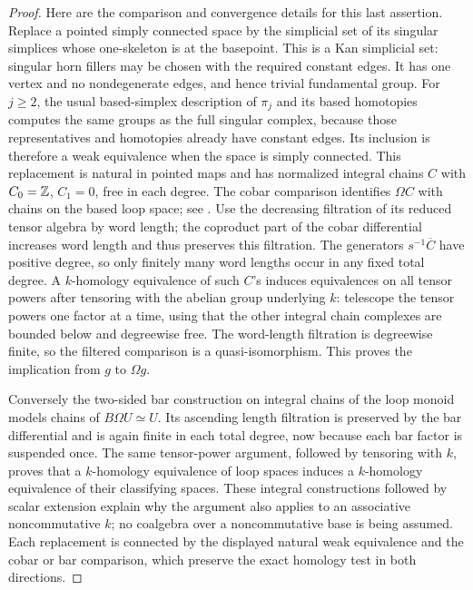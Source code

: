 \begin{proof}
Here are the comparison and convergence details for this last assertion.  Replace a pointed simply connected space by the simplicial set of its singular simplices whose one-skeleton is at the basepoint.  This is a Kan simplicial set: singular horn fillers may be chosen with the required constant edges.  It has one vertex and no nondegenerate edges, and hence trivial fundamental group.  For $j\geq2$, the usual based-simplex description of $\pi_j$ and its based homotopies computes the same groups as the full singular complex, because those representatives and homotopies already have constant edges.  Its inclusion is therefore a weak equivalence when the space is simply connected.  This replacement is natural in pointed maps and has normalized integral chains $C$ with $C_0=\mathbb Z$, $C_1=0$, free in each degree.  The cobar comparison identifies $\Omega C$ with chains on the based loop space; see \citet[Corollary 9.2 and Remark 9.3]{C_RiveraZeinalian2018}.  Use the decreasing filtration of its reduced tensor algebra by word length; the coproduct part of the cobar differential increases word length and thus preserves this filtration.  The generators $s^{-1}\overline C$ have positive degree, so only finitely many word lengths occur in any fixed total degree.  A $k$-homology equivalence of such $C$'s induces equivalences on all tensor powers after tensoring with the abelian group underlying $k$: telescope the tensor powers one factor at a time, using that the other integral chain complexes are bounded below and degreewise free.  The word-length filtration is degreewise finite, so the filtered comparison is a quasi-isomorphism.  This proves the implication from $g$ to $\Omega g$.

Conversely the two-sided bar construction on integral chains of the loop monoid models chains of $B\Omega U\simeq U$.  Its ascending length filtration is preserved by the bar differential and is again finite in each total degree, now because each bar factor is suspended once.  The same tensor-power argument, followed by tensoring with $k$, proves that a $k$-homology equivalence of loop spaces induces a $k$-homology equivalence of their classifying spaces.  These integral constructions followed by scalar extension explain why the argument also applies to an associative noncommutative $k$; no coalgebra over a noncommutative base is being assumed.  Each replacement is connected by the displayed natural weak equivalence and the cobar or bar comparison, which preserve the exact homology test in both directions.
\end{proof}

